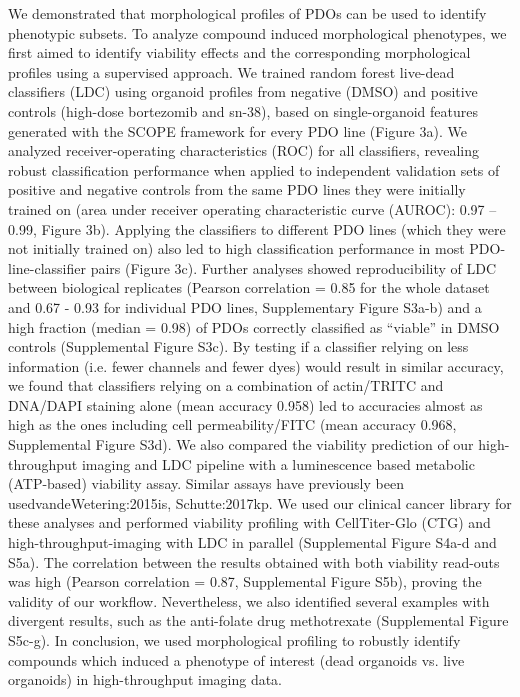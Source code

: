 We demonstrated that morphological profiles of PDOs can be used to identify phenotypic subsets. To analyze compound induced morphological phenotypes, we first aimed to identify viability effects and the corresponding morphological profiles using a supervised approach. We trained random forest live-dead classifiers (LDC) using organoid profiles from negative (DMSO) and positive controls (high-dose bortezomib and sn-38), based on single-organoid features generated with the SCOPE framework for every PDO line (Figure 3a). We analyzed receiver-operating characteristics (ROC) for all classifiers, revealing robust classification performance when applied to independent validation sets of positive and negative controls from the same PDO lines they were initially trained on (area under receiver operating characteristic curve (AUROC): 0.97 – 0.99, Figure 3b). Applying the classifiers to different PDO lines (which they were not initially trained on) also led to high classification performance in most PDO-line-classifier pairs (Figure 3c).
Further analyses showed reproducibility of LDC between biological replicates (Pearson correlation = 0.85 for the whole dataset and 0.67 - 0.93 for individual PDO lines, Supplementary Figure S3a-b) and a high fraction (median = 0.98) of PDOs correctly classified as “viable” in DMSO controls (Supplemental Figure S3c). By testing if a classifier relying on less information (i.e. fewer channels and fewer dyes) would result in similar accuracy, we found that classifiers relying on a combination of actin/TRITC and DNA/DAPI staining alone (mean accuracy 0.958) led to accuracies almost as high as the ones including cell permeability/FITC (mean accuracy 0.968, Supplemental Figure S3d). We also compared the viability prediction of our high-throughput imaging and LDC pipeline with a luminescence based metabolic (ATP-based) viability assay. Similar assays have previously been used{vandeWetering:2015is, Schutte:2017kp}. We used our clinical cancer library for these analyses and performed viability profiling with CellTiter-Glo (CTG) and high-throughput-imaging with LDC in parallel (Supplemental Figure S4a-d and S5a). The correlation between the results obtained with both viability read-outs was high (Pearson correlation = 0.87, Supplemental Figure S5b), proving the validity of our workflow. Nevertheless, we also identified several examples with divergent results, such as the anti-folate drug methotrexate (Supplemental Figure S5c-g).
In conclusion, we used morphological profiling to robustly identify compounds which induced a phenotype of interest (dead organoids vs. live organoids) in high-throughput imaging data.

